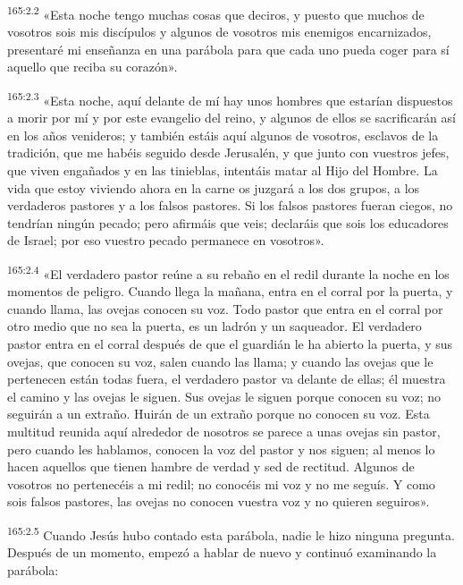 \par 
\textsuperscript{165:2.2} «Esta noche tengo muchas cosas que deciros, y puesto que muchos de vosotros sois mis discípulos y algunos de vosotros mis enemigos encarnizados, presentaré mi enseñanza en una parábola para que cada uno pueda coger para sí aquello que reciba su corazón».

\par 
\textsuperscript{165:2.3} «Esta noche, aquí delante de mí hay unos hombres que estarían dispuestos a morir por mí y por este evangelio del reino, y algunos de ellos se sacrificarán así en los años venideros; y también estáis aquí algunos de vosotros, esclavos de la tradición, que me habéis seguido desde Jerusalén, y que junto con vuestros jefes, que viven engañados y en las tinieblas, intentáis matar al Hijo del Hombre. La vida que estoy viviendo ahora en la carne os juzgará a los dos grupos, a los verdaderos pastores y a los falsos pastores. Si los falsos pastores fueran ciegos, no tendrían ningún pecado; pero afirmáis que veis; declaráis que sois los educadores de Israel; por eso vuestro pecado permanece en vosotros».

\par 
\textsuperscript{165:2.4} «El verdadero pastor reúne a su rebaño en el redil durante la noche en los momentos de peligro. Cuando llega la mañana, entra en el corral por la puerta, y cuando llama, las ovejas conocen su voz. Todo pastor que entra en el corral por otro medio que no sea la puerta, es un ladrón y un saqueador. El verdadero pastor entra en el corral después de que el guardián le ha abierto la puerta, y sus ovejas, que conocen su voz, salen cuando las llama; y cuando las ovejas que le pertenecen están todas fuera, el verdadero pastor va delante de ellas; él muestra el camino y las ovejas le siguen. Sus ovejas le siguen porque conocen su voz; no seguirán a un extraño. Huirán de un extraño porque no conocen su voz. Esta multitud reunida aquí alrededor de nosotros se parece a unas ovejas sin pastor, pero cuando les hablamos, conocen la voz del pastor y nos siguen; al menos lo hacen aquellos que tienen hambre de verdad y sed de rectitud. Algunos de vosotros no pertenecéis a mi redil; no conocéis mi voz y no me seguís. Y como sois falsos pastores, las ovejas no conocen vuestra voz y no quieren seguiros».

\par 
\textsuperscript{165:2.5} Cuando Jesús hubo contado esta parábola, nadie le hizo ninguna pregunta. Después de un momento, empezó a hablar de nuevo y continuó examinando la parábola:

